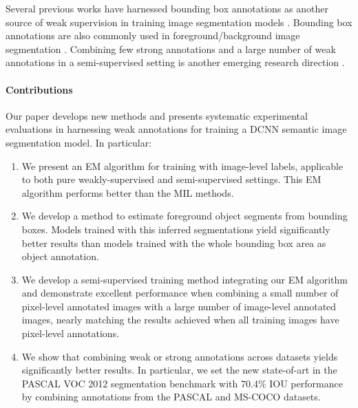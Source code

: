Several previous works have harnessed bounding box annotations as
another source of weak supervision in training image segmentation
models \citet{xia2013semantic, guillaumin2014imagenet, chen2014beat,
  zhu2014learning}. Bounding box annotations are also
commonly used in foreground/background image segmentation
\citep{lempitsky2009image, rother2004grabcut}. 
Combining few strong annotations and a large number of
weak annotations in a semi-supervised setting is another emerging
research direction \citep{Hoffman14Lsda}. 

\paragraph{Contributions}

Our paper develops new methods and presents systematic experimental
evaluations in harnessing weak annotations for training a DCNN
semantic image segmentation model. In particular:
\begin{enumerate}
\item We present an EM algorithm for training with
  image-level labels, applicable to both pure weakly-supervised
  and semi-supervised settings. This EM algorithm
  performs better than the MIL methods.
\item We develop a method to estimate foreground object segments from
  bounding boxes. Models trained with this inferred segmentations
  yield significantly better results than models trained with the
  whole bounding box area as object annotation.
\item We develop a semi-supervised training method integrating our EM
  algorithm and demonstrate excellent performance when combining a
  small number of pixel-level annotated images with a large number of
  image-level annotated images, nearly matching the results achieved
  when all training images have pixel-level annotations.
\item We show that combining weak or strong annotations across
  datasets yields significantly better results. In particular, we set
  the new state-of-art in the PASCAL VOC 2012 segmentation benchmark
  with 70.4\% IOU performance by combining annotations from the PASCAL
  and MS-COCO datasets.
\end{enumerate}

